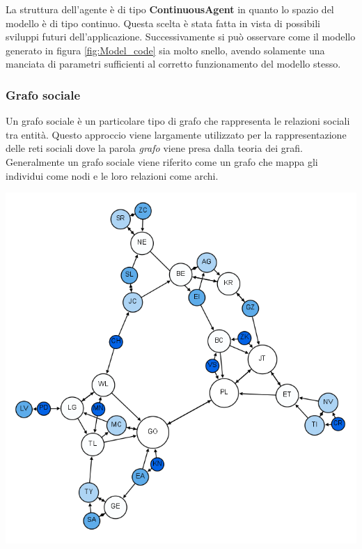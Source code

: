 La struttura dell'agente è di tipo \textbf{ContinuousAgent} in quanto lo 
spazio del modello è di tipo continuo. Questa scelta è stata fatta in vista di possibili 
sviluppi futuri dell'applicazione. Successivamente si può osservare come il modello generato 
in figura \ref{fig:Model_code} sia molto snello, avendo solamente una manciata di parametri 
sufficienti al corretto funzionamento del modello stesso. 

\subsubsection*{Grafo sociale}
Un grafo sociale è un particolare tipo di grafo che rappresenta le relazioni sociali tra entità.
Questo approccio viene largamente utilizzato per la rappresentazione delle reti sociali dove la 
parola \emph{grafo} viene presa dalla teoria dei grafi. Generalmente un grafo sociale viene riferito come un
grafo che mappa gli individui come nodi e le loro relazioni come archi. \cite{wiki:Social_graph}

\begin{minipage}{\linewidth}
    \centering
    \includegraphics[width=\textwidth]{img/Moreno_Sociogram_3rd_Grade.png}
    \label{fig:social_graph}
\end{minipage}

